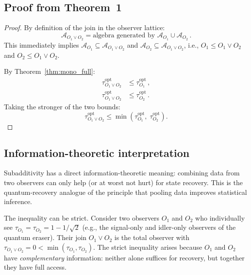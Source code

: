 \documentclass[aps,prd,preprint,superscriptaddress,longbibliography]{revtex4-2}
\newcommand{\tauasym}{\tau}
\newcommand{\algO}{\mathcal{A}}
\begin{document}
\subsection{Proof from Theorem~1}

\begin{proof}
By definition of the join in the observer lattice:
\begin{equation}
  \algO_{O_1 \vee O_2} = \text{algebra generated by }
  \algO_{O_1} \cup \algO_{O_2}\,.
  \label{eq:join_def}
\end{equation}
This immediately implies
$\algO_{O_1} \subseteq \algO_{O_1 \vee O_2}$ and
$\algO_{O_2} \subseteq \algO_{O_1 \vee O_2}$, i.e.,
$O_1 \leq O_1 \vee O_2$ and $O_2 \leq O_1 \vee O_2$.

By Theorem~\ref{thm:mono_full}:
\begin{align}
  \tauasym_{O_1 \vee O_2}^{\mathrm{opt}}
  &\leq \tauasym_{O_1}^{\mathrm{opt}}\,,
  \label{eq:sub1}\\
  \tauasym_{O_1 \vee O_2}^{\mathrm{opt}}
  &\leq \tauasym_{O_2}^{\mathrm{opt}}\,.
  \label{eq:sub2}
\end{align}
Taking the stronger of the two bounds:
\begin{equation}
  \tauasym_{O_1 \vee O_2}^{\mathrm{opt}}
  \leq \min\!\left(\tauasym_{O_1}^{\mathrm{opt}},\;
  \tauasym_{O_2}^{\mathrm{opt}}\right).
  \label{eq:sub_conclusion}
\end{equation}
\end{proof}

\subsection{Information-theoretic interpretation}

Subadditivity has a direct information-theoretic meaning: combining
data from two observers can only help (or at worst not hurt) for
state recovery.  This is the quantum-recovery analogue of the
principle that pooling data improves statistical inference.

The inequality can be strict.  Consider two observers $O_1$ and $O_2$
who individually see $\tauasym_{O_1} = \tauasym_{O_2} = 1 - 1/\sqrt{2}$
(e.g., the signal-only and idler-only observers of the quantum eraser).
Their join $O_1 \vee O_2$ is the total observer with
$\tauasym_{O_1 \vee O_2} = 0 < \min(\tauasym_{O_1},\tauasym_{O_2})$.
The strict inequality arises because $O_1$ and $O_2$ have
\emph{complementary} information: neither alone suffices for recovery,
but together they have full access.
\end{document}
